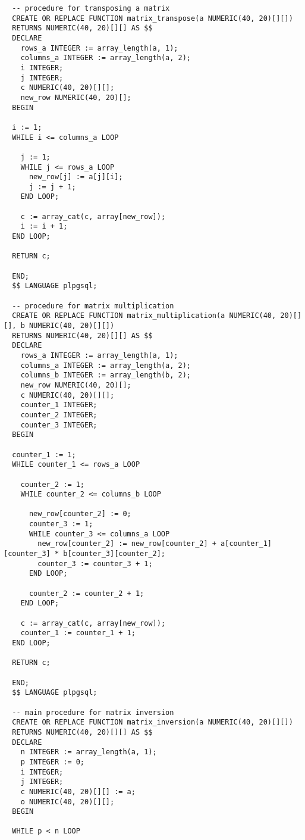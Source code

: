 \begin{verbatim}
  -- procedure for transposing a matrix
  CREATE OR REPLACE FUNCTION matrix_transpose(a NUMERIC(40, 20)[][])
  RETURNS NUMERIC(40, 20)[][] AS $$
  DECLARE
    rows_a INTEGER := array_length(a, 1);
    columns_a INTEGER := array_length(a, 2);
    i INTEGER;
    j INTEGER;
    c NUMERIC(40, 20)[][];
    new_row NUMERIC(40, 20)[];
  BEGIN

  i := 1;
  WHILE i <= columns_a LOOP

    j := 1;
    WHILE j <= rows_a LOOP
      new_row[j] := a[j][i];
      j := j + 1;
    END LOOP;

    c := array_cat(c, array[new_row]);
    i := i + 1;
  END LOOP;

  RETURN c;

  END;
  $$ LANGUAGE plpgsql;

  -- procedure for matrix multiplication
  CREATE OR REPLACE FUNCTION matrix_multiplication(a NUMERIC(40, 20)[][], b NUMERIC(40, 20)[][])
  RETURNS NUMERIC(40, 20)[][] AS $$
  DECLARE
    rows_a INTEGER := array_length(a, 1);
    columns_a INTEGER := array_length(a, 2);
    columns_b INTEGER := array_length(b, 2);
    new_row NUMERIC(40, 20)[];
    c NUMERIC(40, 20)[][];
    counter_1 INTEGER;
    counter_2 INTEGER;
    counter_3 INTEGER;
  BEGIN

  counter_1 := 1;
  WHILE counter_1 <= rows_a LOOP

    counter_2 := 1;
    WHILE counter_2 <= columns_b LOOP

      new_row[counter_2] := 0;
      counter_3 := 1;
      WHILE counter_3 <= columns_a LOOP
        new_row[counter_2] := new_row[counter_2] + a[counter_1][counter_3] * b[counter_3][counter_2];
        counter_3 := counter_3 + 1;
      END LOOP;

      counter_2 := counter_2 + 1;
    END LOOP;

    c := array_cat(c, array[new_row]);
    counter_1 := counter_1 + 1;
  END LOOP;

  RETURN c;

  END;
  $$ LANGUAGE plpgsql;

  -- main procedure for matrix inversion
  CREATE OR REPLACE FUNCTION matrix_inversion(a NUMERIC(40, 20)[][])
  RETURNS NUMERIC(40, 20)[][] AS $$
  DECLARE
    n INTEGER := array_length(a, 1);
    p INTEGER := 0;
    i INTEGER;
    j INTEGER;
    c NUMERIC(40, 20)[][] := a;
    o NUMERIC(40, 20)[][];
  BEGIN

  WHILE p < n LOOP


\end{verbatim}
